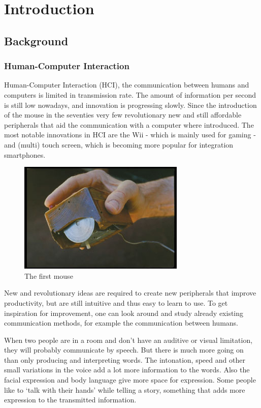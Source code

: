 
\chapter{Introduction}
\label{ch:intro}

\section{Background}
\subsection*{Human-Computer Interaction}
Human-Computer Interaction (HCI), the communication between humans and computers is limited in transmission rate. The amount of information per second is still low nowadays, and innovation is progressing slowly. Since the introduction of the mouse in the seventies very few revolutionary new and still affordable peripherals that aid the communication with a computer where introduced. The most notable innovations in HCI are the Wii - which is mainly used for gaming - and (multi) touch screen, which is becoming more popular for integration smartphones.

\begin{figure}[tb]
	\center{}
	\label{fig:mouse}
	\includegraphics[width=0.3\linewidth]{figures/mouse.jpg}
	\caption{The first mouse}
\end{figure}

New and revolutionary ideas are required to create new peripherals that improve productivity, but are still intuitive and thus easy to learn to use. To get inspiration for improvement, one can look around and study already existing communication methods, for example the communication between humans. 

When two people are in a room and don't have an auditive or visual limitation, they will probably communicate by speech. But there is much more going on than only producing and interpreting words. The intonation, speed and other small variations in the voice add a lot more information to the words. Also the facial expression and body language give more space for expression. Some people like to `talk with their hands' while telling a story, something that adds more expression to the transmitted information.

